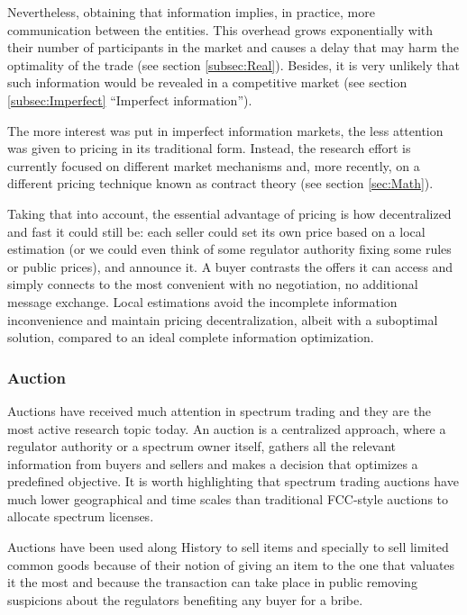 Nevertheless, obtaining that information implies, in practice, more communication between the entities. This overhead grows exponentially with their number of participants in the market and causes a delay that may harm the optimality of the trade (see section \ref{subsec:Real}). Besides, it is very unlikely that such information would be revealed in a competitive market (see section \ref{subsec:Imperfect} ``Imperfect information''). 

The more interest was put in imperfect information markets, the less attention was given to pricing in its traditional form. Instead, the research effort is currently focused on different market mechanisms and, more recently, on a different pricing technique known as contract theory (see section \ref{sec:Math}).

Taking that into account, the essential advantage of pricing is how decentralized and fast it could still be: each seller could set its own price based on a local estimation (or we could even think of some regulator authority fixing some rules or public prices), and announce it. A buyer contrasts the offers it can access and simply connects to the most convenient with no negotiation, no additional message exchange. Local estimations avoid the incomplete information inconvenience and maintain pricing decentralization, albeit with a suboptimal solution, compared to an ideal complete information optimization. 

\subsubsection{Auction}

Auctions have received much attention in spectrum trading and they are the most active research topic today. An auction is a centralized approach, where a regulator authority or a spectrum owner itself, gathers all the relevant information from buyers and sellers and makes a decision that optimizes a predefined objective. It is worth highlighting that spectrum trading auctions have much lower geographical and time scales than traditional FCC-style auctions to allocate spectrum licenses. 

Auctions have been used along History to sell items and specially to sell limited common goods \cite{ref:Courcoubetis2003,ref:Liu2010} because of their notion of giving an item to the one that valuates it the most and because the transaction can take place in public removing suspicions about the regulators benefiting any buyer for a bribe.

